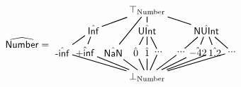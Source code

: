 \[
\abs{Number} = 
\begin{matrix} 
  \begin{tikzpicture}
    \node (top) at (0,0) {$\top_{\mbox{\scriptsize Number}}$};
    \node (upperleft) at (-1.9,-0.7) {$\hat{\SF{Inf}}$};
    \node (uppercenter) at (0,-0.7) {$\hat{\SF{UInt}}$};
    \node (upperright) at (2.1,-0.7) {$\hat{\SF{NUInt}}$};
    \node (lower1) at (-3.0,-1.5) {$\hat{\SF{-inf}}$};
    \node (lower2) at (-2.2,-1.5) {$\hat{\SF{+inf}}$};
    \node (lower3) at (-1.2,-1.5) {$\hat{\SF{NaN}}$};
    \node (lower4) at (-0.4,-1.5) {$\hat{0}$};
    \node (lower5) at (0,-1.5) {$\hat{1}$};
    \node (lower6) at (0.4,-1.5) {...};
    \node (lower7) at (1.2,-1.5) {...};
    \node (lower8) at (1.8,-1.5) {$\hat{-42}$};
    \node (lower9) at (2.4,-1.5) {$\hat{1.2}$};
    \node (lower10) at (3,-1.5) {...};
    \node (down) at (0,-2.4) {$\bot_{\mbox{\scriptsize Number}}$};
    \draw [black, thick, shorten <= -1pt, shorten >=-1pt] (top) -- (upperleft);
    \draw [black, thick, shorten <= -1pt, shorten >=-1pt] (top) -- (uppercenter);
    \draw [black, thick, shorten <= -1pt, shorten >=-1pt] (top) -- (upperright);
    \draw [black, thick, shorten <= -1pt, shorten >=-1pt] (top) -- (lower3);
    \draw [black, thick, shorten <= -1pt, shorten >=-1pt] (upperleft) -- (lower1);
    \draw [black, thick, shorten <= -1pt, shorten >=-1pt] (upperleft) -- (lower2);
    \draw [black, thick, shorten <= -1pt, shorten >=-1pt] (uppercenter) -- (lower4);
    \draw [black, thick, shorten <= -1pt, shorten >=-1pt] (uppercenter) -- (lower5);
    \draw [black, thick, shorten <= -1pt, shorten >=-1pt] (uppercenter) -- (lower6);
    \draw [black, thick, shorten <= -1pt, shorten >=-1pt] (upperright) -- (lower7);
    \draw [black, thick, shorten <= -1pt, shorten >=-1pt] (upperright) -- (lower8);
    \draw [black, thick, shorten <= -1pt, shorten >=-1pt] (upperright) -- (lower9);
    \draw [black, thick, shorten <= -1pt, shorten >=-1pt] (upperright) -- (lower10);
    \draw [black, thick, shorten <= -1pt, shorten >=-1pt] (lower1) -- (down);
    \draw [black, thick, shorten <= -1pt, shorten >=-1pt] (lower2) -- (down);
    \draw [black, thick, shorten <= -1pt, shorten >=-1pt] (lower3) -- (down);
    \draw [black, thick, shorten <= -1pt, shorten >=-1pt] (lower4) -- (down);
    \draw [black, thick, shorten <= -1pt, shorten >=-1pt] (lower5) -- (down);
    \draw [black, thick, shorten <= -1pt, shorten >=-1pt] (lower6) -- (down);
    \draw [black, thick, shorten <= -1pt, shorten >=-1pt] (lower7) -- (down);
    \draw [black, thick, shorten <= -1pt, shorten >=-1pt] (lower8) -- (down);
    \draw [black, thick, shorten <= -1pt, shorten >=-1pt] (lower9) -- (down);
    \draw [black, thick, shorten <= -1pt, shorten >=-1pt] (lower10) -- (down);
  \end{tikzpicture}
\end{matrix}
\]
